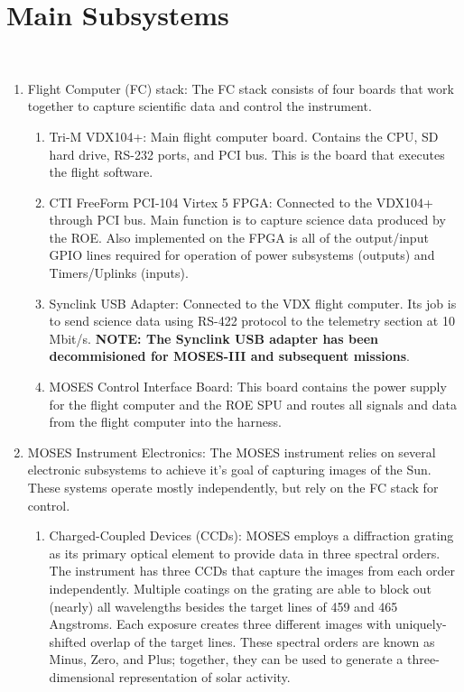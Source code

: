 %
\section{Main Subsystems}
\hrulefill
\\

	\begin{enumerate}
		\item Flight Computer (FC) stack: The FC stack consists of four boards that work together to capture scientific data and control the instrument.
		\begin{enumerate}
			\item Tri-M VDX104+: Main flight computer board. Contains the CPU, SD hard drive, RS-232 ports, and PCI bus. This is the board that executes the flight software.
			\item CTI FreeForm PCI-104 Virtex 5 FPGA: Connected to the VDX104+ through PCI bus. Main function is to capture science data produced by the ROE. Also implemented on the FPGA is all of the output/input GPIO lines required for operation of power subsystems (outputs) and Timers/Uplinks (inputs).
			\item Synclink USB Adapter: Connected to the VDX flight computer. Its job is to send science data using RS-422 protocol to the telemetry section at 10 Mbit/s. \textbf{NOTE: The Synclink USB adapter has been decommisioned for MOSES-III and subsequent missions}.
			\item MOSES Control Interface Board: This board contains the power supply for the flight computer and the ROE SPU and routes all signals and data from the flight computer into the harness.
		\end{enumerate}
		\item MOSES Instrument Electronics: The MOSES instrument relies on several electronic subsystems to achieve it's goal of capturing images of the Sun. These systems operate mostly independently, but rely on the FC stack for control.
		\begin{enumerate}
			\item Charged-Coupled Devices (CCDs): MOSES employs a diffraction grating as its primary optical element to provide data in three spectral orders. The instrument has three CCDs that capture the images from each order independently. Multiple coatings on the grating are able to block out (nearly) all wavelengths besides the target lines of 459 and 465 Angstroms. Each exposure creates three different images with uniquely-shifted overlap of the target lines. These spectral orders are known as Minus, Zero, and Plus; together, they can be used to generate a three-dimensional representation of solar activity.

\end{enumerate}
\end{enumerate}
